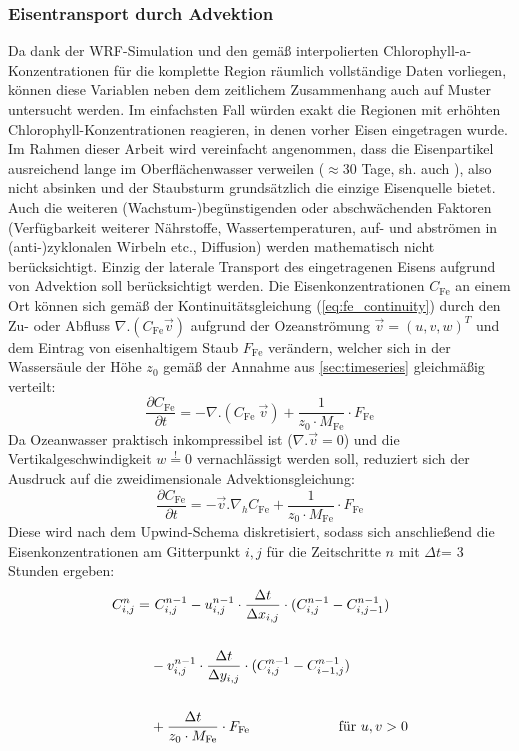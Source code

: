 \documentclass[12pt,a4paper,onecolumn,headheight=30pt]{scrartcl}
\begin{document}
\subsubsection{Eisentransport durch Advektion} \label{sec:methods_advection}
Da dank der WRF-Simulation und den gemäß \citet{Saulquin.2019} interpolierten Chlorophyll-a-Konzentrationen für die komplette Region räumlich vollständige Daten vorliegen, können diese Variablen neben dem zeitlichem Zusammenhang auch auf Muster untersucht werden. Im einfachsten Fall würden exakt die Regionen mit erhöhten Chlorophyll-Konzentrationen reagieren, in denen vorher Eisen eingetragen wurde. Im Rahmen dieser Arbeit wird vereinfacht angenommen, dass die Eisenpartikel ausreichend lange im Oberflächenwasser verweilen ($\approx$30 Tage, sh. auch \citet{Cropp.2013}), also nicht absinken und der Staubsturm grundsätzlich die einzige Eisenquelle bietet. Auch die weiteren (Wachstum-)begünstigenden oder abschwächenden Faktoren (Verfügbarkeit weiterer Nährstoffe, Wassertemperaturen, auf- und abströmen in (anti-)zyklonalen Wirbeln etc., Diffusion) werden mathematisch nicht berücksichtigt. Einzig der laterale Transport des eingetragenen Eisens aufgrund von Advektion soll berücksichtigt werden. Die Eisenkonzentrationen $C_\text{Fe}$ an einem Ort können sich gemäß der Kontinuitätsgleichung (\ref{eq:fe_continuity}) durch den Zu- oder Abfluss $\nabla . (C_\text{Fe} \vec{v})$ aufgrund der Ozeanströmung $\vec{v} = (u,v,w)^T$  und dem Eintrag von eisenhaltigem Staub $F_\text{Fe}$ verändern, welcher sich in der Wassersäule der Höhe $z_0$ gemäß der Annahme aus \ref{sec:timeseries} gleichmäßig verteilt:
\begin{equation}
\frac{\partial C_\text{Fe}}{\partial t} = - \nabla . (C_\text{Fe} \ \vec{v}) + \frac{1}{z_0 \cdot M_\text{Fe}} \cdot F_\text{Fe} \label{eq:fe_continuity}
\end{equation}
Da Ozeanwasser praktisch inkompressibel ist ($\nabla . \vec{v}=0$) und die Vertikalgeschwindigkeit $w\overset{!}{=}0$ vernachlässigt werden soll, reduziert sich der Ausdruck auf die zweidimensionale Advektionsgleichung:
\begin{equation}
\frac{\partial C_\text{Fe}}{\partial t} = - \vec{v} . \nabla_h  C_\text{Fe}  + \frac{1}{z_0 \cdot M_\text{Fe}} \cdot F_\text{Fe} \label{eq:fe_advection}
\end{equation}
Diese wird nach dem Upwind-Schema diskretisiert, sodass sich anschließend die Eisenkonzentrationen am Gitterpunkt $i,j$ für die Zeitschritte $n$ mit $\Delta t$= 3 Stunden ergeben:
\begin{equation}
\begin{split}
C_{i,j}^n = &\ C_{i,j}^{n-1} - u_{i,j}^{n-1} \cdot \frac{\Delta t}{\Delta x_{i,j}} \cdot (C_{i,j}^{n-1} - C_{i,j-1}^{n-1}) \\\\
&- v_{i,j}^{n-1} \cdot \frac{\Delta t}{\Delta y_{i,j}} \cdot (C_{i,j}^{n-1} - C_{i-1,j}^{n-1})  \\\\
&+ \frac{\Delta t}{z_0 \cdot M_\text{Fe}} \cdot F_\text{Fe} \text{ \qquad  \qquad \qquad für } u,v > 0 \\\\
\end{split}
\end{equation}
\end{document}
